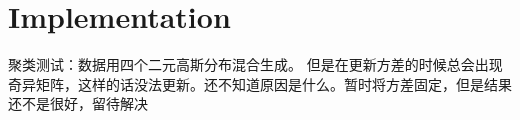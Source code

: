 \documentclass{ctexart}
\begin{document}
%
\section{Implementation}
聚类测试：数据用四个二元高斯分布混合生成。
但是在更新方差的时候总会出现奇异矩阵，这样的话没法更新。还不知道原因是什么。暂时将方差固定，但是结果还不是很好，留待解决
%
%
%
%
%
\end{document}
